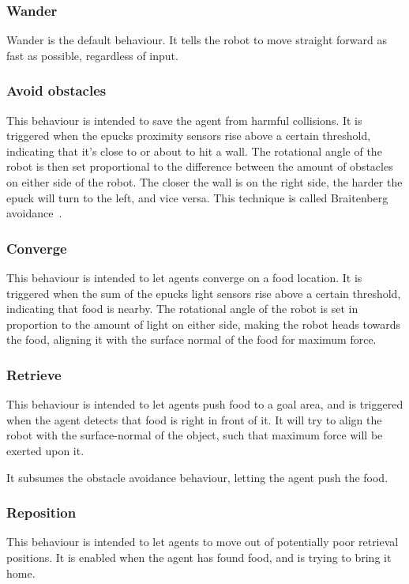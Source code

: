 \documentclass[a4paper]{article}
\begin{document}
\subsubsection{Wander}
Wander is the default behaviour.
It tells the robot to move straight forward as fast as possible, regardless of input.

\subsubsection{Avoid obstacles}
This behaviour is intended to save the agent from harmful collisions.
It is triggered when the epucks proximity sensors rise above a certain threshold, indicating that it's close to or about to hit a wall.
The rotational angle of the robot is then set proportional to the difference between the amount of obstacles on either side of the robot.
The closer the wall is on the right side, the harder the epuck will turn to the left, and vice versa.
This technique is called Braitenberg avoidance~\cite{braitenberg}.

\subsubsection{Converge}
This behaviour is intended to let agents converge on a food location.
It is triggered when the sum of the epucks light sensors rise above a certain threshold, indicating that food is nearby.
The rotational angle of the robot is set in proportion to the amount of light on either side, making the robot heads towards the food, aligning it with the surface normal of the food for maximum force.

\subsubsection{Retrieve}
This behaviour is intended to let agents push food to a goal area, and is triggered when the agent detects that food is right in front of it.
It will try to align the robot with the surface-normal of the object, such that maximum force will be exerted upon it.

It subsumes the obstacle avoidance behaviour, letting the agent push the food.

\subsubsection{Reposition}
This behaviour is intended to let agents to move out of potentially poor retrieval positions.
It is enabled when the agent has found food, and is trying to bring it home.
\end{document}
